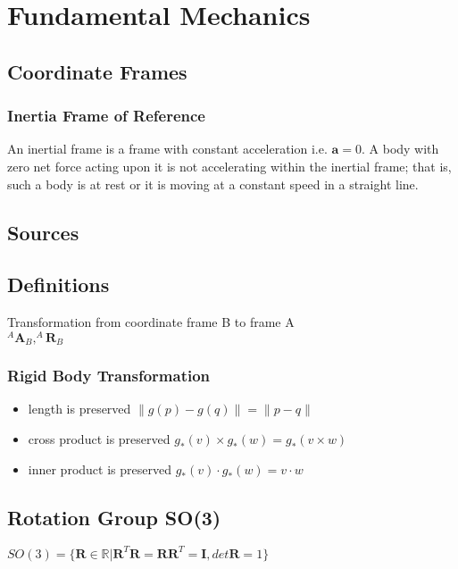 \section{Fundamental Mechanics}

\subsection{Coordinate Frames}

\subsubsection{Inertia Frame of Reference}
An inertial frame is a frame with constant acceleration i.e. $\mathbf{a} = 0$.  A body with zero net force acting upon it is not accelerating within the inertial frame; that is, such a body is at rest or it is moving at a constant speed in a straight line.



\subsection{Sources}

\subsection{Definitions}
Transformation from coordinate frame B to frame A
\\

$^A\mathbf{A}_B, ^A\mathbf{R}_B$

\subsubsection{Rigid Body Transformation}
\begin{itemize}
\item length is preserved $\|g(p)-g(q)\| = \|p-q\|$
\item cross product is preserved $g_*(v) \times g_*(w) = g_*(v \times w)$
\item inner product is preserved $g_*(v) \cdot g_*(w) = v \cdot w$
\end{itemize}

\subsection{Rotation Group SO(3)}

$SO(3) = \{\mathbf{R} \in \mathbb{R} | \mathbf{R}^T\mathbf{R}=\mathbf{R}\mathbf{R}^T=\mathbf{I}, det\mathbf{R}=1 \} $

